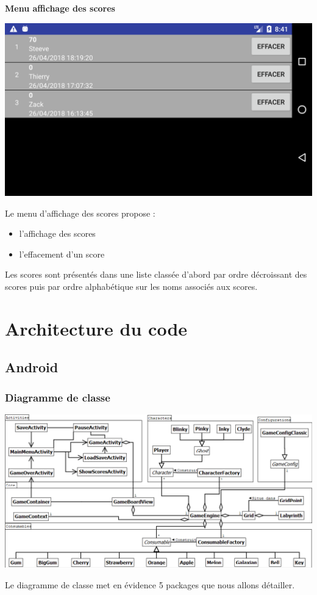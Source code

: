 \documentclass{article}
\begin{document}
\bigskip

\textbf{Menu affichage des scores}
\begin{center}
  \includegraphics[scale=0.25]{ShowScoresActivity.png}
\end{center}
Le menu d’affichage des scores propose :
\begin{itemize}
\item l’affichage des scores
\item l'effacement d'un score
\end{itemize}
Les scores sont présentés dans une liste classée d’abord par ordre décroissant des scores puis par ordre alphabétique sur les noms associés aux scores.



\section{Architecture du code}


\subsection{Android} %

\subsubsection{Diagramme de classe}
\begin{center}
  \includegraphics[scale=0.40]{ClassDiagram.png}
\end{center}
Le diagramme de classe met en évidence 5 packages que nous allons détailler.
\end{document}
